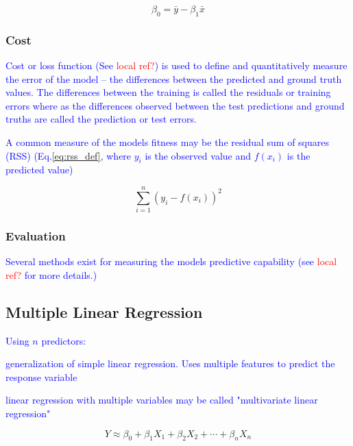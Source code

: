 \begin{equation}
{\beta_0 =  \bar{y} - \beta_1 \bar{x}}
\label{eq:slr_ols_intercept}
\end{equation}

\subsubsection{Cost}

\textcolor{blue}{Cost or loss function (See \textcolor{red}{local ref?}) is used to define and quantitatively measure the error of the model -- the differences between the predicted and ground truth values. The differences between the training is called the residuals or training errors where as the differences observed between the test predictions and ground truths are called the prediction or test errors.}

\textcolor{blue}{A common measure of the models fitness may be the {residual sum of squares (RSS)} (Eq.\ref{eq:rss_def}, where $y_i$ is the observed value and $f(x_i)$ is the predicted value)}

\begin{equation}
{\sum_{i=1}^{n}{(y_i - f(x_i))^2}}
\label{eq:rss_def}
\end{equation}


\subsubsection{Evaluation}

\textcolor{blue}{Several methods exist for measuring the models predictive capability (see \textcolor{red}{local ref?} for more details.)}


\subsection{Multiple Linear Regression}

\textcolor{blue}{Using $n$ predictors:}

\textcolor{blue}{generalization of simple linear regression. Uses multiple features to predict the response variable}

\textcolor{blue}{linear regression with multiple variables may be called "multivariate linear regression"}



\begin{equation}
{Y \approx \beta_0 + \beta_1 X_1 + \beta_2 X_2 + \cdots + \beta_n X_n}
\label{eq:mlr_ex}
\end{equation}


